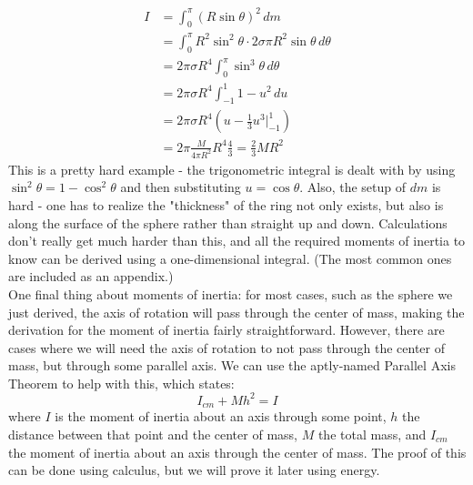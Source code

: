 \begin{align*}
	I &= \int_0^\pi (R \sin \theta)^2 \, dm \\
	&= \int_0^\pi R^2 \sin^2 \theta \cdot 2 \sigma \pi R^2 \sin \theta \, d\theta \\
	&= 2\pi \sigma R^4 \int_0^\pi \sin^3 \theta \, d\theta\\
	&= 2\pi \sigma R^4 \int_{-1}^1 1 - u^2 \, du \\
	&= 2\pi \sigma R^4 \left( u - \frac{1}{3}u^3 \Big|_{-1}^1 \right)	\\
	&= 2 \pi\frac{M}{4\pi R^2}  R^4 \frac{4}{3} = \frac{2}{3}MR^2
\end{align*}
This is a pretty hard example - the trigonometric integral is dealt with by using $\sin^2 \theta = 1 - \cos^2 \theta$ and then substituting $u = \cos \theta$. Also, the setup of $dm$ is hard - one has to realize the "thickness" of the ring not only exists, but also is along the surface of the sphere rather than straight up and down. Calculations don't really get much harder than this, and all the required moments of inertia to know can be derived using a one-dimensional integral. (The most common ones are included as an appendix.)\\
One final thing about moments of inertia: for most cases, such as the sphere we just derived, the axis of rotation will pass through the center of mass, making the derivation for the moment of inertia fairly straightforward. However, there are cases where we will need the axis of rotation to not pass through the center of mass, but through some parallel axis. We can use the aptly-named Parallel Axis Theorem to help with this, which states:
\[
	I_{cm} + Mh^2 = I
\]
where $I$ is the moment of inertia about an axis through some point, $h$ the distance between that point and the center of mass, $M$ the total mass, and $I_{cm}$ the moment of inertia about an axis through the center of mass. The proof of this can be done using calculus, but we will prove it later using energy. 
